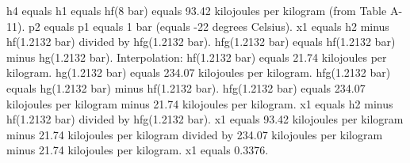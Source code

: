 h4 equals h1 equals hf(8 bar) equals 93.42 kilojoules per kilogram (from Table A-11).  
p2 equals p1 equals 1 bar (equals -22 degrees Celsius).  
x1 equals h2 minus hf(1.2132 bar) divided by hfg(1.2132 bar).  
hfg(1.2132 bar) equals hf(1.2132 bar) minus hg(1.2132 bar).  
Interpolation:  
hf(1.2132 bar) equals 21.74 kilojoules per kilogram.  
hg(1.2132 bar) equals 234.07 kilojoules per kilogram.  
hfg(1.2132 bar) equals hg(1.2132 bar) minus hf(1.2132 bar).  
hfg(1.2132 bar) equals 234.07 kilojoules per kilogram minus 21.74 kilojoules per kilogram.  
x1 equals h2 minus hf(1.2132 bar) divided by hfg(1.2132 bar).  
x1 equals 93.42 kilojoules per kilogram minus 21.74 kilojoules per kilogram divided by 234.07 kilojoules per kilogram minus 21.74 kilojoules per kilogram.  
x1 equals 0.3376.